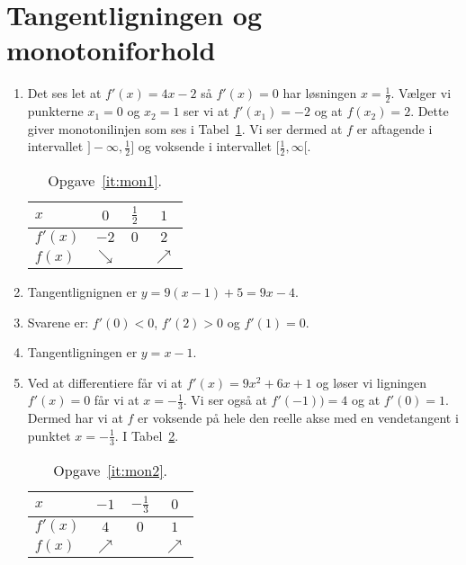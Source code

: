 \section{Tangentligningen og monotoniforhold}
\begin{enumerate}
	
	\item\label{it:mon1} Det ses let at $f'(x)=4x-2$ så $f'(x)=0$ har løsningen $x=\frac{1}{2}$. Vælger vi punkterne $x_1=0$ og $x_2=1$ ser vi at $f'(x_1)=-2$ og at $f(x_2)=2$. Dette giver monotonilinjen som ses i Tabel~\ref{fig:mon1}. Vi ser dermed at $f$ er aftagende i intervallet $ ]-\infty,\frac{1}{2}] $ og voksende i intervallet $[\frac{1}{2},\infty[$.
	
	\begin{table}[h!]
		\centering
		\begin{tabular}{@{}l  c c c@{}}
			$x$      & $0$ 		 & $\frac{1}{2}$	& $1$			\\ \toprule
			$f'(x)$  & $-2$		 &     $0$ 		 	& $2$			\\ \midrule
			$f(x)$   & $\searrow$&					& $\nearrow$	\\ \bottomrule  
		\end{tabular}
		\caption{Opgave~\ref{it:mon1}.}
		\label{fig:mon1}
	\end{table}
	
	
	\item Tangentlignignen er $y=9(x-1)+5=9x-4$.
	
	\item Svarene er: $f'(0)<0$, $f'(2)>0$ og $f'(1)=0$.
	
	
	\item Tangentligningen er $y=x-1$.
	
	\item \label{it:mon2} Ved at differentiere får vi at $f'(x) = 9x^2+6x+1$ og løser vi ligningen $f'(x)=0$ får vi at $x=-\frac{1}{3}$. Vi ser også at $f'(-1))=4$ og at $f'(0)=1$. Dermed har vi at $f$ er voksende på hele den reelle akse med en vendetangent i punktet $x=-\frac{1}{3}$. I Tabel~\ref{fig:mon2}.
	\begin{table}[h!]
	\centering
	\begin{tabular}{@{}l  c c c@{}}
		$x$      & $-1$ 	 & $-\frac{1}{3}$	& $0$			\\ \toprule
		$f'(x)$  & $4$		 &     $0$ 		 	& $1$			\\ \midrule
		$f(x)$   & $\nearrow$&					& $\nearrow$	\\ \bottomrule  
	\end{tabular}
	\caption{Opgave~\ref{it:mon2}.}
	\label{fig:mon2}
\end{table}



\end{enumerate}
